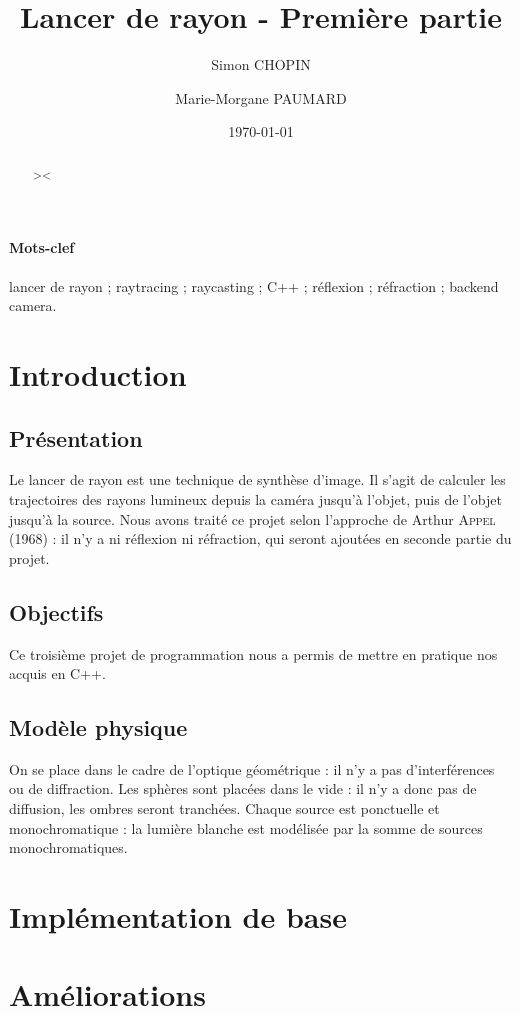\documentclass{article}
\title{Lancer de rayon - Première partie}
\author{Simon CHOPIN \and Marie-Morgane PAUMARD}
\date{\today}
\begin{document}
\maketitle
\tableofcontents
\begin{abstract}
><
\end{abstract}

\paragraph{Mots-clef}
lancer de rayon ; raytracing ; raycasting ; C++ ; réflexion ; réfraction ;
backend camera.

\section{Introduction}
\subsection{Présentation}
Le lancer de rayon est une technique de synthèse d’image. Il s’agit de calculer
les trajectoires des rayons lumineux depuis la caméra jusqu’à l’objet, puis de
l’objet jusqu’à la source.
Nous avons traité ce projet selon l'approche de Arthur \textsc{Appel} (1968) :
il n'y a ni réflexion ni réfraction, qui seront ajoutées en seconde partie du
projet.

\subsection{Objectifs}
Ce troisième projet de programmation nous a permis de mettre en pratique nos
acquis en C++.

\subsection{Modèle physique}
On se place dans le cadre de l'optique géométrique : il n'y a pas
d'interférences ou de diffraction. Les sphères sont placées dans le vide : il
n'y a donc pas de diffusion, les ombres seront tranchées. Chaque source est
ponctuelle et monochromatique : la lumière blanche est modélisée par la somme
de sources monochromatiques.

\section{Implémentation de base}


\section{Améliorations}
\end{document}
